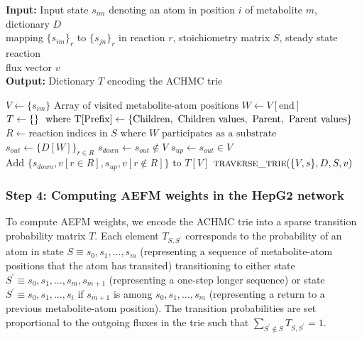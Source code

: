 \documentclass[12pt]{article}
\begin{document}
\begin{algorithm}
\caption{Depth-first construction of the ACHMC trie}\label{alg01:trie}
\hspace*{\algorithmicindent} \textbf{Input:} Input state $s_{im}$
denoting an atom in position $i$ of metabolite $m$, dictionary $D$ \\
\hspace*{\algorithmicindent} mapping $\{s_{im}\}_r$ to $\{s_{jn}\}_r$ in reaction $r$, stoichiometry matrix $S$, steady state reaction\\
\hspace*{\algorithmicindent} flux vector $v$\\
\hspace*{\algorithmicindent} \textbf{Output:} Dictionary $T$ encoding the ACHMC trie
\begin{algorithmic}[1]
    \State $V \gets \{s_{im}\} \text{ Array of visited metabolite-atom positions}$
    \State $W \gets V[\text{end}] \text{}$
    \State $T \gets \{\}\ \text{ where T[\text{Prefix}]} \gets \{\text{Children}, \text{ Children values}, \text{ Parent}, \text{ Parent values}\}$
    \State $R \gets \text{reaction indices in } S \text{ where } W \text{ participates as a substrate}$
    \State $s_{out} \gets \{D[W]\}_{r \in R}$
    \State $s_{down} \gets s_{out} \notin V$ 
    \State $s_{up} \gets s_{out} \in V$
    \State $\text{Add } \{s_{down}, v[r\in R], s_{up}, v[r\notin R]\} \text{ to } T[V]$
        \State $\textsc{traverse\_trie}(\{V, s\}, D, S, v)$
    \EndFor
\EndFunction
\end{algorithmic}
\end{algorithm}

\subsubsection*{Step 4: Computing AEFM weights in the HepG2 network}

To compute AEFM weights, we encode the ACHMC trie into a sparse transition
probability matrix $T$. Each element $T_{S,S^\prime}$ corresponds to the
probability of an atom in state $S \equiv s_0, s_1, \ldots, s_m$
(representing a sequence of metabolite-atom positions that the atom has
transited) transitioning to either state $S^\prime \equiv s_0, s_1,
\ldots, s_m, s_{m+1}$ (representing a one-step longer sequence) or state
$S^\prime \equiv s_0, s_1, \ldots, s_i$ if $s_{m+1}$ is among $s_0, s_1,
\ldots, s_m$ (representing a return to a previous metabolite-atom
position). The transition probabilities are set proportional to the
outgoing fluxes in the trie such that $\sum_{S^{\prime}\notin S}
T_{S,S^{\prime}} = 1$.
\end{document}
